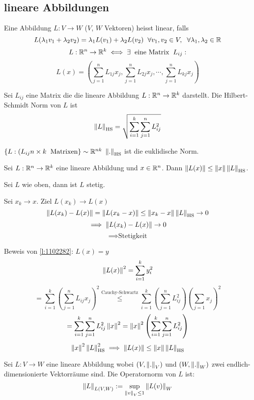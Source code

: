 \subsection{lineare Abbildungen}
\begin{Def}
  Eine Abbildung $L:V\to W$ ($V$, $W$ Vektoren) heisst linear, falls
  \[L(\lambda_1v_1+\lambda_2v_2)=\lambda_1L(v_1)+\lambda_2L(v_2)\hspace{2mm}\forall v_1,v_2\in V,\hspace{2mm}\forall \lambda_1,\lambda_2\in\mathbb{R}\]
  \[L:\mathbb{R}^n\to\mathbb{R}^k\iff \exists\hspace{2mm}\text{eine Matrix}\hspace{2mm} L_{ij}:\]
  \[L(x)=\left( \sum^n_{j=1}L_{1j}x_j,\sum^n_{j=1}L_{2j}x_j,\cdots,\sum^n_{j=1}L_{kj}x_j \right)\]
\end{Def}
\begin{Def}
  Sei $L_{ij}$ eine Matrix die die lineare Abbildung $L:\mathbb{R}^n\to\mathbb{R}^k$ darstellt. Die Hilbert-Schmidt Norm von $L$ ist
  \[\left\| L \right\|_{\text{HS}}=\sqrt{\sum^k_{i=1}\sum^n_{j=1}L_{ij}^2}\]
\end{Def}
\begin{Bem}
  $\left\{ L:(L_{ij} n\times k\hspace{2mm}\text{Matrixen} \right\}\sim \mathbb{R}^{nk}$ $\left\| . \right\|_{\text{HS}}$ ist die euklidische Norm.
\end{Bem}
\begin{Bem}
  Sei $L:\mathbb{R}^n\to\mathbb{R}^k$ eine lineare Abbildung und $x\in\mathbb{R}^n$. Dann $\left\| L(x) \right\|\leq\left\| x \right\|\left\| L \right\|_\text{HS}$.
\end{Bem}
\begin{Kor}
  Sei $L$ wie oben, dann ist $L$ stetig.
\end{Kor}
\begin{Bew}
  Sei $x_k\to x$. Ziel $L(x_k)\to L(x)$
  \[\left\| L(x_k)-L(x) \right\|=\left\| L(x_k-x) \right\|\leq\left\| x_k-x \right\|\left\| L \right\|_\text{HS}\to 0\]
  \[\implies \left\| L(x_k)-L(x) \right\|\to 0\]
  \[\implies \text{Stetigkeit}\]
\end{Bew}
\begin{Bew}
  Beweis von \ref{l:1102282}: $L(x)=y$
  \[\left\| L(x) \right\|^2=\sum^k_{i=1}y_i^2\]
  \[=\sum^k_{i=1}\left( \sum^n_{j=1}L_{ij}x_j \right)^2\stackrel{\text{Cauchy-Schwartz}}{\leq}\sum^k_{i=1}\left( \sum^n_{j=1}L_{ij}^2 \right)\left( \sum_{j=1}x_j \right)^2\]
  \[=\sum^k_{i=1}\sum^n_{j=1}L_{ij}^2\left\| x \right\|^2=\left\| x \right\|^2\left( \sum^k_{i=1}\sum^n_{j=1}L_{ij}^2 \right)\]
  \[\left\| x \right\|^2\left\| L \right\|^2_\text{HS}\implies \left\| L(x) \right\|\leq\left\| x \right\|\left\| L \right\|_\text{HS}\]
\end{Bew}
\begin{Def}
  Sei $L:V\to W$ eine lineare Abbildung wobei $(V,\left\| . \right\|_V)$ und $(W,\left\| . \right\|_W)$ zwei endlich-dimensionierte Vektorräume sind. Die Operatornorm von $L$ ist:
  \[\left\| L \right\|_{L(V,W)}:=\sup_{\left\| v \right\|_V\leq 1}\left\| L(v) \right\|_W\]
\end{Def}
